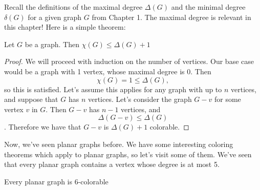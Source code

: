 Recall the definitions of the maximal degree $\Delta(G)$ and the minimal degree $\delta(G)$ for a given graph $G$ from Chapter 1. The maximal degree is relevant in this chapter! Here is a simple theorem:

\begin{theorem}
    Let $G$ be a graph. Then $\chi(G) \leq \Delta(G) + 1$
\end{theorem}
\begin{proof}
    We will proceed with induction on the number of vertices. Our base case would be a graph with 1 vertex, whose maximal degree is 0. Then\[\chi(G) = 1 \leq \Delta(G),\] so this is satisfied. Let's assume this applies for any graph with up to $n$ vertices, and suppose that $G$ has $n$ vertices. Let's consider the graph $G-v$ for some vertex $v$ in $G$. Then $G-v$ has $n-1$ vertices, and
    \[ \Delta(G-v) \leq \Delta(G) \].
    Therefore we have that $G-v$ is $\Delta(G) + 1$ colorable.
\end{proof}

Now, we've seen planar graphs before. We have some interesting coloring theorems which apply to planar graphs, so let's visit some of them. We've seen that every planar graph contains a vertex whose degree is at most 5.

\begin{theorem}
    Every planar graph is 6-colorable
\end{theorem}